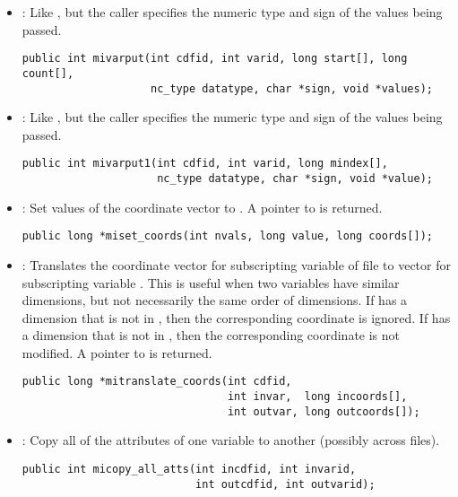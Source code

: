 \begin{itemize}
\item {} : Like , but the caller specifies
the numeric type and sign of the values being passed.
\begin{verbatim}
public int mivarput(int cdfid, int varid, long start[], long count[],
                    nc_type datatype, char *sign, void *values);
\end{verbatim}

\item {} : Like , but the caller specifies
the numeric type and sign of the values being passed.
\begin{verbatim}
public int mivarput1(int cdfid, int varid, long mindex[],
                     nc_type datatype, char *sign, void *value);
\end{verbatim}

\item {} : Set  values of the coordinate
vector  to . A pointer to  is
returned.
\begin{verbatim}
public long *miset_coords(int nvals, long value, long coords[]);
\end{verbatim}

\item {} : Translates the coordinate vector
 for subscripting variable  of file
 to vector  for subscripting variable
. This is useful when two variables have similar
dimensions, but not necessarily the same order of dimensions. If
 has a dimension that is not in , then the
corresponding coordinate is ignored. If  has a dimension
that is not in , then the corresponding coordinate is not
modified. A pointer to  is returned.
\begin{verbatim}
public long *mitranslate_coords(int cdfid, 
                                int invar,  long incoords[],
                                int outvar, long outcoords[]);
\end{verbatim}

\item {} : Copy all of the attributes of one
variable to another (possibly across files).
\begin{verbatim}
public int micopy_all_atts(int incdfid, int invarid, 
                           int outcdfid, int outvarid);
\end{verbatim}


\end{itemize}
